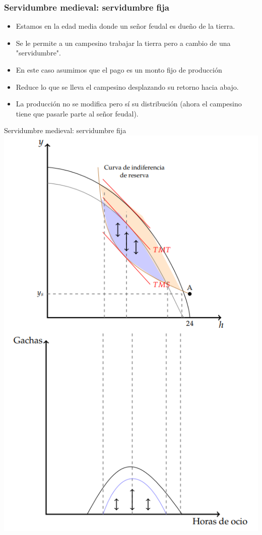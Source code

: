 \documentclass{beamer}
\begin{document}
\begin{frame}
\frametitle{Servidumbre medieval: servidumbre fija}
\begin{itemize}
    \item Estamos en la edad media donde un señor feudal es dueño de la tierra. 
    \item Se le permite a un campesino trabajar la tierra pero a cambio de una "servidumbre". 
    \item  En este caso asumimos que el pago es un monto fijo de producción 
    \item Reduce lo que se lleva el campesino desplazando su retorno hacia abajo.
    \item La producción no se modifica pero sí su distribución (ahora el campesino tiene que pasarle parte al señor feudal). 
\end{itemize}
\end{frame}

\begin{frame}{Servidumbre medieval: servidumbre fija}
    \centering
    \includegraphics[scale=0.45]{../Figures/C19.12.png}
\end{frame}
\end{document}
